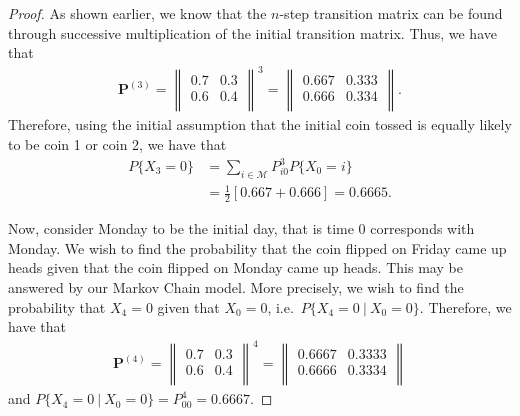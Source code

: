 \begin{proof}
  As shown earlier, we know that the $n$-step transition matrix can be found
  through successive multiplication of the initial transition matrix. Thus, we have that
  \begin{align*}
    \boldsymbol{P}^{(3)} =
    \begin{Vmatrix}
      0.7 & 0.3 \\
      0.6 & 0.4 \\
    \end{Vmatrix}^3
    =
    \begin{Vmatrix}
      0.667 & 0.333 \\
      0.666 & 0.334 \\
    \end{Vmatrix}.
  \end{align*}
  Therefore, using the initial assumption that the initial coin tossed is equally likely to
  be coin 1 or coin 2, we have that
  \begin{align*}
    P\{X_3=0\} &= \sum_{i\in\mathcal{M}}P_{i0}^3P\{X_0 = i\} \\
    &= \frac{1}{2}\left[0.667 + 0.666\right] =0.6665.
  \end{align*}

  Now, consider Monday to be the initial day, that is time 0 corresponds with Monday.
  We wish to find the probability that the coin flipped on Friday came up heads
  given that the coin flipped on Monday came up heads. This may be answered
  by our Markov Chain model. More precisely, we wish to find the probability
  that $X_4 = 0$ given that $X_0 = 0$, i.e.\ $P\{X_4 = 0 \ | \ X_0 = 0\}$.
  Therefore, we have that
  \begin{align*}
    \boldsymbol{P}^{(4)} =
    \begin{Vmatrix}
      0.7 & 0.3 \\
      0.6 & 0.4 \\
    \end{Vmatrix}^4
    =
    \begin{Vmatrix}
      0.6667 & 0.3333 \\
      0.6666 & 0.3334 \\
    \end{Vmatrix}
  \end{align*}
  and $P\{X_4 = 0 \ | \ X_0 = 0\} = P_{00}^4 = 0.6667$.


\end{proof}
\newpage

